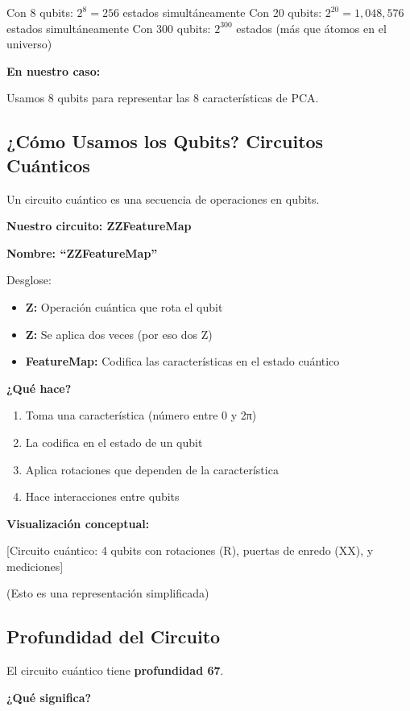 \documentclass[11pt,a4paper,spanish]{article}
\begin{document}
Con 8 qubits: $2^8 = 256$ estados simultáneamente  
Con 20 qubits: $2^{20} = 1,048,576$ estados simultáneamente  
Con 300 qubits: $2^{300}$ estados (más que átomos en el universo)

\textbf{En nuestro caso:}

Usamos 8 qubits para representar las 8 características de PCA.

\subsection{¿Cómo Usamos los Qubits? Circuitos Cuánticos}

Un circuito cuántico es una secuencia de operaciones en qubits.

\textbf{Nuestro circuito: ZZFeatureMap}

\textbf{Nombre: ``ZZFeatureMap''}

Desglose:
\begin{itemize}
    \item \textbf{Z:} Operación cuántica que rota el qubit
    \item \textbf{Z:} Se aplica dos veces (por eso dos Z)
    \item \textbf{FeatureMap:} Codifica las características en el estado cuántico
\end{itemize}

\textbf{¿Qué hace?}

\begin{enumerate}
    \item Toma una característica (número entre 0 y 2π)
    \item La codifica en el estado de un qubit
    \item Aplica rotaciones que dependen de la característica
    \item Hace interacciones entre qubits
\end{enumerate}

\textbf{Visualización conceptual:}

[Circuito cuántico: 4 qubits con rotaciones (R), puertas de enredo (XX), y mediciones]

(Esto es una representación simplificada)

\subsection{Profundidad del Circuito}

El circuito cuántico tiene \textbf{profundidad 67}.

\textbf{¿Qué significa?}
\end{document}
